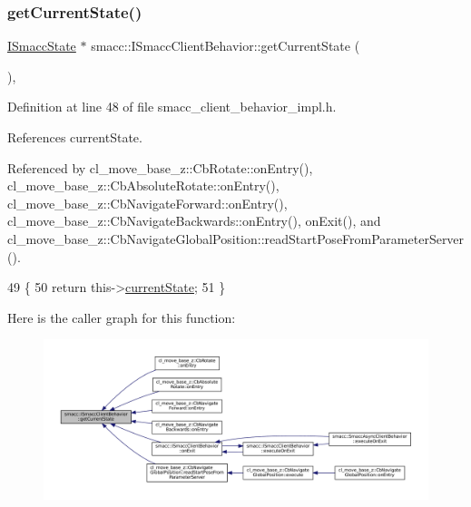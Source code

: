 \subsubsection{\texorpdfstring{get\+Current\+State()}{getCurrentState()}}
{\footnotesize\ttfamily \hyperlink{classsmacc_1_1ISmaccState}{I\+Smacc\+State} $\ast$ smacc\+::\+I\+Smacc\+Client\+Behavior\+::get\+Current\+State (\begin{DoxyParamCaption}{ }\end{DoxyParamCaption})\hspace{0.3cm}{\ttfamily [inline]}, {\ttfamily [protected]}}



Definition at line 48 of file smacc\+\_\+client\+\_\+behavior\+\_\+impl.\+h.



References current\+State.



Referenced by cl\+\_\+move\+\_\+base\+\_\+z\+::\+Cb\+Rotate\+::on\+Entry(), cl\+\_\+move\+\_\+base\+\_\+z\+::\+Cb\+Absolute\+Rotate\+::on\+Entry(), cl\+\_\+move\+\_\+base\+\_\+z\+::\+Cb\+Navigate\+Forward\+::on\+Entry(), cl\+\_\+move\+\_\+base\+\_\+z\+::\+Cb\+Navigate\+Backwards\+::on\+Entry(), on\+Exit(), and cl\+\_\+move\+\_\+base\+\_\+z\+::\+Cb\+Navigate\+Global\+Position\+::read\+Start\+Pose\+From\+Parameter\+Server().


\begin{DoxyCode}
49 \{
50     \textcolor{keywordflow}{return} this->\hyperlink{classsmacc_1_1ISmaccClientBehavior_a5a6658a2deb72b700ae595e594617616}{currentState};
51 \}
\end{DoxyCode}
Here is the caller graph for this function\+:
\nopagebreak
\begin{figure}[H]
\begin{center}
\leavevmode
\includegraphics[width=350pt]{classsmacc_1_1ISmaccClientBehavior_a34fde34e48fa13db622ee60d8374d0b8_icgraph}
\end{center}
\end{figure}
\mbox{\label{classsmacc_1_1ISmaccClientBehavior_a18e4bec9460b010f2894c0f7e7064a34}} 
